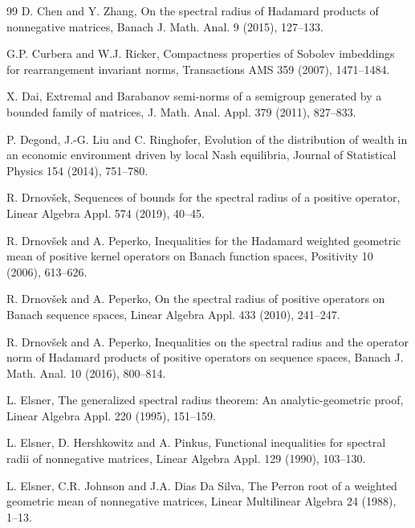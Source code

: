 \documentclass[12pt, reqno]{amsart}
\theoremstyle{definition}
\theoremstyle{remark}
\numberwithin{equation}{section}
\begin{document}
\begin{thebibliography}{99}
 D. Chen and Y. Zhang,  On the spectral radius of Hadamard products of nonnegative matrices, Banach J. Math. Anal.  9 (2015), 127--133. %


 G.P. Curbera and W.J. Ricker, Compactness properties of Sobolev imbeddings for rearrangement invariant norms,
 Transactions AMS 359  (2007),  1471--1484.


 X. Dai, Extremal and Barabanov semi-norms of a semigroup generated by
a bounded family of matrices, J. Math. Anal. Appl. 379 (2011), 827--833.

 P. Degond, J.-G. Liu and C. Ringhofer,
Evolution of the distribution of wealth in an economic environment driven by local Nash equilibria,  Journal of Statistical Physics 154 (2014), 751--780.

 R. Drnov\v sek,  Sequences of bounds for the spectral radius of a positive operator, Linear Algebra Appl. 574 (2019), 40--45.

 R. Drnov\v sek and A. Peperko,  Inequalities for the Hadamard
        weighted geometric mean of positive kernel operators on Banach function spaces,
         Positivity 10 (2006), 613--626.

 R. Drnov\v sek and A. Peperko,  On the spectral radius of positive operators on Banach
sequence spaces,  Linear Algebra Appl.  433 (2010), 241--247.

 R. Drnov\v sek and A. Peperko, Inequalities on the spectral radius and the operator norm of Hadamard products of positive operators on sequence spaces, Banach J. Math. Anal. 10 (2016), 800--814.


 L. Elsner, The generalized spectral radius theorem: An analytic-geometric proof,
         Linear Algebra Appl. 220 (1995), 151--159.


 L. Elsner, D. Hershkowitz and A. Pinkus,  Functional inequalities
        for spectral radii of nonnegative matrices, Linear Algebra Appl. 129 (1990), 103--130.

 L. Elsner, C.R. Johnson and J.A. Dias Da Silva,
  	The Perron root of a weighted geometric mean of nonnegative matrices,
	Linear Multilinear Algebra 24 (1988), 1--13.




\end{thebibliography}
\end{document}
